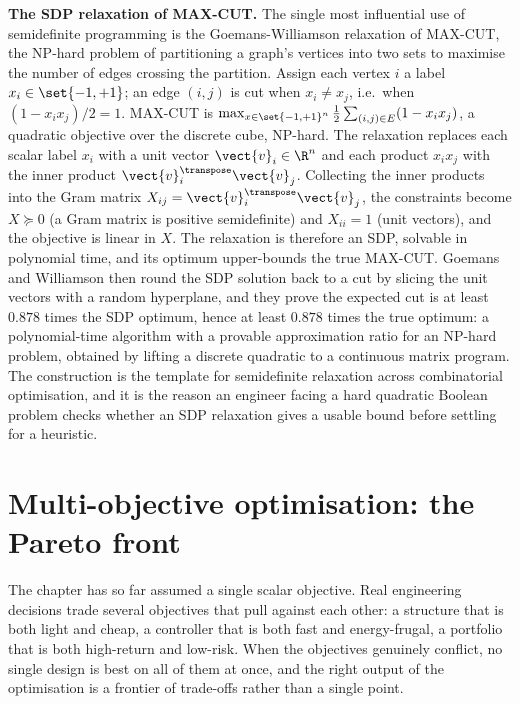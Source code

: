 \begin{mastery}
\textbf{The SDP relaxation of MAX-CUT.} The single most influential
use of semidefinite programming is the Goemans-Williamson relaxation
of MAX-CUT, the NP-hard problem of partitioning a graph's vertices into
two sets to maximise the number of edges crossing the partition.
Assign each vertex $i$ a label $x_{i} \in \set{-1, +1}$; an edge
$(i, j)$ is cut when $x_{i} \neq x_{j}$, i.e.\ when $(1 - x_{i}
x_{j})/2 = 1$. MAX-CUT is $\max_{x \in \set{-1,+1}^{n}} \tfrac{1}{2}
\sum_{(i,j) \in E} (1 - x_{i} x_{j})$, a quadratic objective over the
discrete cube, NP-hard. The relaxation replaces each scalar label
$x_{i}$ with a unit vector $\vect{v}_{i} \in \R^{n}$ and each product
$x_{i} x_{j}$ with the inner product $\vect{v}_{i}^{\transpose}
\vect{v}_{j}$. Collecting the inner products into the Gram matrix
$X_{ij} = \vect{v}_{i}^{\transpose} \vect{v}_{j}$, the constraints
become $X \succeq 0$ (a Gram matrix is positive semidefinite) and
$X_{ii} = 1$ (unit vectors), and the objective is linear in $X$. The
relaxation is therefore an SDP, solvable in polynomial time, and its
optimum upper-bounds the true MAX-CUT. Goemans and Williamson then
round the SDP solution back to a cut by slicing the unit vectors with a
random hyperplane, and they prove the expected cut is at least $0.878$
times the SDP optimum, hence at least $0.878$ times the true optimum: a
polynomial-time algorithm with a provable approximation ratio for an
NP-hard problem, obtained by lifting a discrete quadratic to a
continuous matrix program. The construction is the template for
semidefinite relaxation across combinatorial optimisation, and it is
the reason an engineer facing a hard quadratic Boolean problem checks
whether an SDP relaxation gives a usable bound before settling for a
heuristic.
\end{mastery}

\section{Multi-objective optimisation: the Pareto front}

The chapter has so far assumed a single scalar objective. Real
engineering decisions trade several objectives that pull against each
other: a structure that is both light and cheap, a controller that is
both fast and energy-frugal, a portfolio that is both high-return and
low-risk. When the objectives genuinely conflict, no single design is
best on all of them at once, and the right output of the optimisation
is a frontier of trade-offs rather than a single point.

